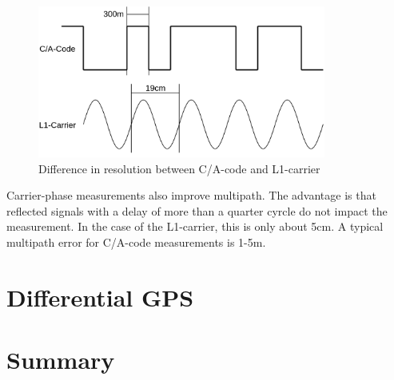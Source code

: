 \begin{figure}[ht]
 \centering
 \includegraphics[height=5cm]{images/Carrier-Phase_Measurement.png}
 \caption{Difference in resolution between C/A-code and L1-carrier}
 \label{fig:carrier_phase}
\end{figure}

Carrier-phase measurements also improve multipath.
The advantage is that reflected signals with a delay of more than a quarter cyrcle do not impact the measurement.
In the case of the L1-carrier, this is only about 5cm.
A typical multipath error for C/A-code measurements is 1-5m.

\section{Differential GPS}

\section{Summary}